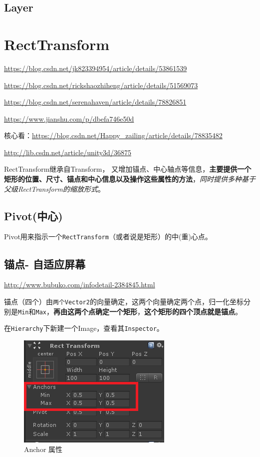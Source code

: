 \documentclass[UTF8,a4paper,12pt]{ctexbook}
\begin{document}
		\subsection{Layer}
		
		
	\section{RectTransform}
		\url{https://blog.csdn.net/jk823394954/article/details/53861539}
	
		\url{https://blog.csdn.net/rickshaozhiheng/article/details/51569073}
		
		\url{https://blog.csdn.net/serenahaven/article/details/78826851}
		
		\url{https://www.jianshu.com/p/dbefa746e50d}
		
		核心看：\url{https://blog.csdn.net/Happy_zailing/article/details/78835482}
		
		\url{http://lib.csdn.net/article/unity3d/36875}
		
		RectTransform继承自Transform， 又增加锚点、中心轴点等信息，\textbf{主要提供一个矩形的位置、尺寸、锚点和中心信息以及操作这些属性的方法}，\textit{同时提供多种基于父级RectTransform的缩放形式}。
		
		\subsection{Pivot(中心)}
			Pivot用来指示一个\verb|RectTransform|（或者说是矩形）的中(重)心点。	
	
		\subsection{锚点- 自适应屏幕}
			\url{http://www.bubuko.com/infodetail-2384845.html}
			
			
			锚点（四个）由\verb|两个Vector2|的向量确定，这两个向量确定两个点，归一化坐标分别是\verb|Min|和\verb|Max|，\textbf{再由这两个点确定一个矩形}，\textbf{这个矩形的四个顶点就是锚点}。
			
			在\verb|Hierarchy|下新建一个Image，查看其\verb|Inspector|。
			
			\begin{figure}[H]
				\centering
				\includegraphics[scale=1.2]{Anchor.png}
				\caption{Anchor 属性}
			\end{figure}
			
\end{document}
